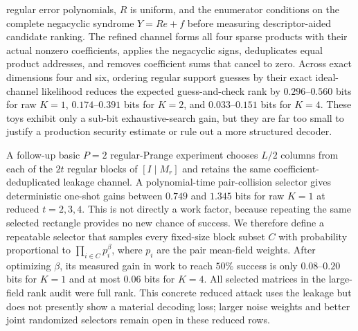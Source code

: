 regular error polynomials, $R$ is uniform, and the enumerator conditions on
the complete negacyclic syndrome $Y=Re+f$ before measuring descriptor-aided
candidate ranking.  The refined channel forms all four sparse products with
their actual nonzero coefficients, applies the negacyclic signs, deduplicates
equal product addresses, and removes coefficient sums that cancel to zero.
Across exact dimensions four and six, ordering regular support guesses by
their exact ideal-channel likelihood reduces the expected guess-and-check
rank by $0.296$--$0.560$ bits for raw $K=1$, $0.174$--$0.391$ bits for $K=2$,
and $0.033$--$0.151$ bits for $K=4$.  These
toys exhibit only a sub-bit exhaustive-search gain, but they are far too small
to justify a production security estimate or rule out a more structured
decoder.

A follow-up basic $P=2$ regular-Prange experiment chooses $L/2$ columns from
each of the $2t$ regular blocks of $[I\mid M_r]$ and retains the same
coefficient-deduplicated leakage channel.  A polynomial-time pair-collision
selector gives deterministic one-shot gains between $0.749$ and $1.345$ bits
for raw $K=1$ at reduced $t=2,3,4$.  This is not directly a work factor,
because repeating the same selected rectangle provides no new chance of
success.  We therefore define a repeatable selector that samples every
fixed-size block subset $C$ with probability proportional to
$\prod_{i\in C}p_i^\beta$, where $p_i$ are the pair mean-field weights.  After
optimizing $\beta$, its measured gain in work to reach $50\%$ success is only
$0.08$--$0.20$ bits for $K=1$ and at most $0.06$ bits for $K=4$.  All selected
matrices in the large-field rank audit were full rank.  This concrete reduced
attack uses the leakage but does not presently show a material decoding loss;
larger noise weights and better joint randomized selectors remain open in
these reduced rows.

